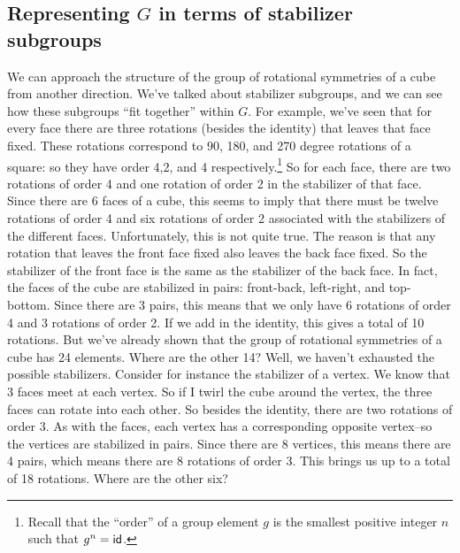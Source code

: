\subsection{Representing $G$ in terms of stabilizer subgroups}
We can approach the structure of the group of rotational symmetries of a cube from another direction.  We've talked about stabilizer subgroups, and we can see how these subgroups ``fit together'' within $G$.
For example, we've seen that for every face there are three rotations (besides the identity) that leaves that face fixed. These rotations correspond to 90, 180, and 270 degree rotations of a square: so they have order 4,2, and 4 respectively.\footnote{Recall that the ``order'' of a group element $g$ is the smallest positive integer $n$ such that $g^n = \sf{id}$.} So for each face, there are two rotations of order 4 and one rotation of order 2 in the stabilizer of that face. Since there are 6 faces of a cube, this seems to imply that there must be twelve rotations of order 4 and six rotations of order 2 associated with the stabilizers of the different faces.  Unfortunately, this is not quite true. The reason is that any rotation that leaves the front face fixed also leaves the back face fixed. So the stabilizer of the front face is the same as the stabilizer  of the back face. In fact, the faces of the cube are stabilized in pairs: front-back, left-right, and top-bottom. Since there are 3 pairs, this means that we only have 6 rotations of order 4 and 3 rotations of order 2. If we add in the identity, this gives a total of 10 rotations. But we've already shown that the group of rotational symmetries of a cube has 24 elements. Where are the other 14?
Well, we haven't exhausted the possible stabilizers. Consider for instance the stabilizer of a vertex. We know that 3 faces meet at each vertex. So if I twirl the cube around the vertex, the three faces can rotate into each other. So besides the identity, there are two rotations of order 3. As with the faces, each vertex has a corresponding opposite vertex--so the vertices are stabilized in pairs. Since there are 8 vertices, this means there are 4 pairs, which means there are 8 rotations of order 3. This brings us up to a total of 18 rotations. Where are the other six?

